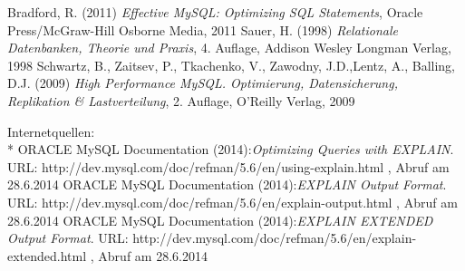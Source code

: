\newpage
{}
  \begin{thebibliography}{}



     Bradford, R. (2011) {\sl Effective MySQL: Optimizing SQL Statements}, Oracle Press/McGraw-Hill Osborne Media, 2011
     Sauer, H. (1998) {\sl Relationale Datenbanken, Theorie und Praxis}, 4. Auflage, Addison Wesley Longman Verlag, 1998
     Schwartz, B., Zaitsev, P., Tkachenko, V., Zawodny, J.D.,Lentz, A., Balling, D.J. (2009) 
        {\sl High Performance MySQL. Optimierung, Datensicherung, Replikation \& Lastverteilung}, 2. Auflage,  O'Reilly Verlag, 2009

	Internetquellen:\\*
	ORACLE MySQL Documentation (2014):{\sl Optimizing Queries with EXPLAIN}. URL: 
	http://dev.mysql.com/doc/refman/5.6/en/using-explain.html , Abruf am 28.6.2014
    ORACLE MySQL Documentation (2014):{\sl EXPLAIN Output Format}. URL: http://dev.mysql.com/doc/refman/5.6/en/explain-output.html , Abruf am 28.6.2014
	ORACLE MySQL Documentation (2014):{\sl EXPLAIN EXTENDED Output Format}. URL:
	http://dev.mysql.com/doc/refman/5.6/en/explain-extended.html , Abruf am 28.6.2014

  \end{thebibliography}
